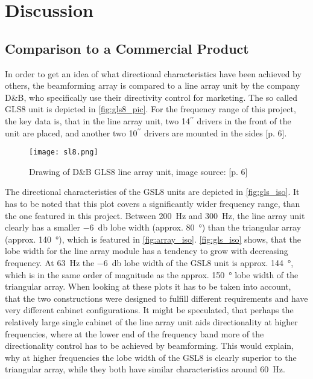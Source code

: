 \chapter{Discussion}
\section{Comparison to a Commercial Product}
In order to get an idea of what directional characteristics have been achieved by others, the beamforming array is compared to a line array unit by the company D\&B, who specifically use their directivity control for marketing. The so called GLS8 unit is depicted in \autoref{fig:gls8_pic}. For the frequency range of this project, the key data is, that in the line array unit, two 14$^{\prime \prime}$ drivers in the front of the unit are placed, and another two 10$^{\prime \prime}$ drivers are mounted in the sides \citep{SL_GSL}[p. 6]. 
\begin{figure}[H]
\centering
\texttt{[image: sl8.png]}
\caption{Drawing of D\&B GLS8 line array unit, image source: \citep{SL_GSL}[p. 6]}
\label{fig:gls8_pic}
\end{figure}
The directional characteristics of the GSL8 units are depicted in \autoref{fig:gls_iso}. 
It has to be noted that this plot covers a significantly wider frequency range, than the one featured in this project. Between \SI{200}{\hertz} and \SI{300}{\hertz}, the line array unit clearly has a smaller \SI{-6}{\decibel} lobe width (approx. \SI{80}{\degree}) than the triangular array (approx. \SI{140}{\degree}), which is featured in \autoref{fig:array_iso}.
\autoref{fig:gls_iso} shows, that the lobe width for the line array module has a tendency to grow with decreasing frequency. At \SI{63}{\hertz} the \SI{-6}{\decibel} lobe width of the GSL8 unit is approx. \SI{144}{\degree}, which is in the same order of magnitude as the approx. \SI{150}{\degree} lobe width of the triangular array. When looking at these plots it has to be taken into account, that the two constructions were designed to fulfill different requirements and have very different cabinet configurations. It might be speculated, that perhaps the relatively large single cabinet of the line array unit aids directionality at higher frequencies, where at the lower end of the frequency band more of the directionality control has to be achieved by beamforming. This would explain, why at higher frequencies the lobe width of the GSL8 is clearly superior to the triangular array, while they both have similar characteristics around \SI{60}{\hertz}.
